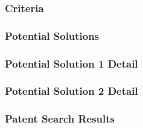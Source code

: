\documentclass{beamer}
\begin{document}
\begin{frame}
  \frametitle{Criteria}
\end{frame}

\begin{frame}
  \frametitle{Potential Solutions}
\end{frame}

\begin{frame}
  \frametitle{Potential Solution 1 Detail}
\end{frame}

\begin{frame}
  \frametitle{Potential Solution 2 Detail}
\end{frame}

\begin{frame}
  \frametitle{Patent Search Results}
\end{frame}
\end{document}
